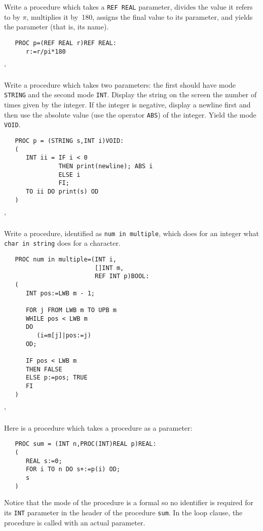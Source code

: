 \begin{exercise}
\item Write a procedure which takes a \verb|REF REAL| parameter,
divides the value it refers to by $\pi$, multiplies it by~180,
assigns the final value to its parameter, and yields the parameter
(that is, its name). \ans \ %
\begin{verbatim}
   PROC p=(REF REAL r)REF REAL:
      r:=r/pi*180
\end{verbatim}
'
\item Write a procedure which takes two parameters: the first should
have mode \verb|STRING| and the second mode \verb|INT|. Display the
string on the screen the number of times given by the integer. If the
integer is negative, display a newline first and then use the
absolute value (use the operator \verb|ABS|) of the integer. Yield
the mode \verb|VOID|. \ans \ %
\begin{verbatim}
   PROC p = (STRING s,INT i)VOID:
   (
      INT ii = IF i < 0
               THEN print(newline); ABS i
               ELSE i
               FI;
      TO ii DO print(s) OD
   )
\end{verbatim}
'
\item Write a procedure, identified as \verb|num in multiple|, which
does for an integer what \verb|char in string| does for a character.
\ans \ %
\begin{verbatim}
   PROC num in multiple=(INT i,
                         []INT m,
                         REF INT p)BOOL:
   (
      INT pos:=LWB m - 1;

      FOR j FROM LWB m TO UPB m
      WHILE pos < LWB m
      DO
         (i=m[j]|pos:=j)
      OD;

      IF pos < LWB m
      THEN FALSE
      ELSE p:=pos; TRUE
      FI
   )
\end{verbatim}
'
\end{exercise}

Here is a procedure which takes a procedure as a parameter:
\begin{verbatim}
   PROC sum = (INT n,PROC(INT)REAL p)REAL:
   (
      REAL s:=0;
      FOR i TO n DO s+:=p(i) OD;
      s
   )
\end{verbatim}
\noindent
Notice that the mode of the procedure
 is a formal  so no
identifier is required for its \verb|INT| parameter in the header of
the procedure \verb|sum|. In the loop clause, the procedure is called
with an actual parameter.

